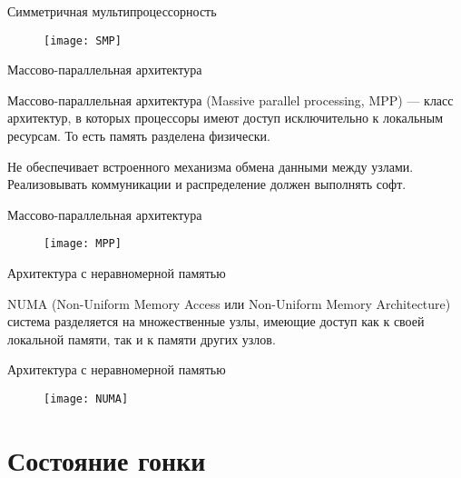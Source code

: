 \begin{frame}{Симметричная мультипроцессорность}

\begin{figure}[htp]
	\centering
	\texttt{[image: SMP]}
\end{figure}

\end{frame}

\begin{frame}{Массово-параллельная архитектура}

Массово-параллельная архитектура (\abbr Massive parallel processing, MPP) --- класс архитектур, в которых процессоры имеют доступ исключительно к локальным ресурсам. То есть память разделена физически.

Не обеспечивает встроенного механизма обмена данными между узлами. Реализовывать коммуникации и распределение должен выполнять софт.

\end{frame}

\begin{frame}{Массово-параллельная архитектура}

\begin{figure}[htp]
	\centering
	\texttt{[image: MPP]}
\end{figure}

\end{frame}

\begin{frame}{Архитектура с неравномерной памятью}

NUMA (Non-Uniform Memory Access или Non-Uniform Memory Architecture) система разделяется на множественные узлы, имеющие доступ как к своей локальной памяти, так и к памяти других узлов.

\end{frame}

\begin{frame}{Архитектура с неравномерной памятью}

\begin{figure}[htp]
	\centering
	\texttt{[image: NUMA]}
\end{figure}

\end{frame}

\section{Состояние гонки}


